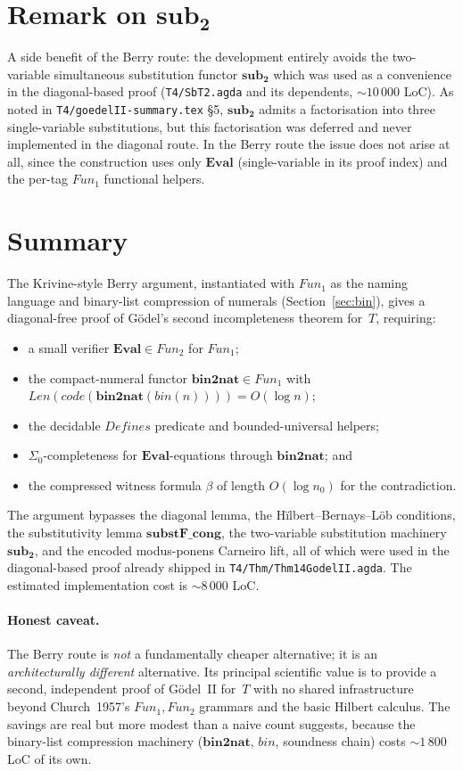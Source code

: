 \documentclass[11pt]{article}
\theoremstyle{plain}
\theoremstyle{definition}
\theoremstyle{remark}
\newcommand{\code}[1]{\mathit{code}(#1)}
\newcommand{\Fun}{\mathit{Fun}}
\newcommand{\Defines}{\mathit{Defines}}
\newcommand{\Len}{\mathit{Len}}
\newcommand{\Eval}{\mathbf{Eval}}
\newcommand{\bnt}{\mathbf{bin2nat}}
\newcommand{\bin}{\mathit{bin}}
\begin{document}
\section{Remark on $\mathbf{sub_2}$}

A side benefit of the Berry route: the development entirely avoids the
two-variable simultaneous substitution functor $\mathbf{sub_2}$ which
was used as a convenience in the diagonal-based proof
(\verb|T4/SbT2.agda| and its dependents, $\sim 10\,000$ LoC).  As
noted in \verb|T4/goedelII-summary.tex| {\S}5, $\mathbf{sub_2}$
admits a factorisation into three single-variable substitutions, but
this factorisation was deferred and never implemented in the diagonal
route.  In the Berry route the issue does not arise at all, since the
construction uses only $\Eval$ (single-variable in its proof index)
and the per-tag $\Fun_1$ functional helpers.

\section{Summary}

The Krivine-style Berry argument, instantiated with $\Fun_1$ as the
naming language and binary-list compression of numerals
(Section~\ref{sec:bin}), gives a diagonal-free proof of G\"odel's
second incompleteness theorem for~$T$, requiring:
\begin{itemize}
\item a small verifier $\Eval \in \Fun_2$ for $\Fun_1$;
\item the compact-numeral functor $\bnt \in \Fun_1$ with
$\Len(\code{\bnt(\bin(n))}) = O(\log n)$;
\item the decidable $\Defines$ predicate and bounded-universal helpers;
\item $\Sigma_0$-completeness for $\Eval$-equations through
$\bnt$; and
\item the compressed witness formula $\beta$ of length
$O(\log n_0)$ for the contradiction.
\end{itemize}
The argument bypasses the diagonal lemma, the
H\"ilbert--Bernays--L\"ob conditions, the substitutivity lemma
$\mathbf{substF\_cong}$, the two-variable substitution machinery
$\mathbf{sub_2}$, and the encoded modus-ponens Carneiro lift, all of
which were used in the diagonal-based proof already shipped in
\verb|T4/Thm/Thm14GodelII.agda|.  The estimated implementation cost
is $\sim 8\,000$ LoC.

\paragraph{Honest caveat.}  The Berry route is \emph{not} a fundamentally
cheaper alternative; it is an \emph{architecturally different}
alternative.  Its principal scientific value is to provide a second,
independent proof of G\"odel~II for~$T$ with no shared infrastructure
beyond Church~1957's $\Fun_1, \Fun_2$ grammars and the basic Hilbert
calculus.  The savings are real but more modest than a naive count
suggests, because the binary-list compression machinery
($\bnt$, $\bin$, soundness chain) costs $\sim 1\,800$ LoC of its own.
\end{document}
